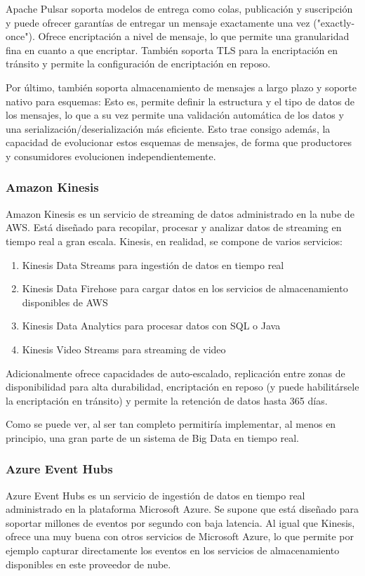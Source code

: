 Apache Pulsar soporta modelos de entrega como colas, publicación y suscripción y puede ofrecer garantías de entregar un mensaje 
exactamente una vez ("exactly-once"). Ofrece encriptación a nivel de mensaje, lo que permite una granularidad fina en cuanto a que encriptar. 
También soporta TLS para la encriptación en tránsito y permite la configuración de encriptación en reposo.
\newline

Por último, también soporta almacenamiento de mensajes a largo plazo y soporte nativo para esquemas:
Esto es, permite definir la estructura y el tipo de datos de los mensajes, lo que a su vez permite una validación automática de los datos 
y una serialización/deserialización más eficiente. Esto trae consigo además, la capacidad de evolucionar estos esquemas de mensajes,
de forma que productores y consumidores evolucionen independientemente.

\subsubsection{Amazon Kinesis}
Amazon Kinesis es un servicio de streaming de datos administrado en la nube de AWS. 
Está diseñado para recopilar, procesar y analizar datos de streaming en tiempo real a gran escala.
Kinesis, en realidad, se compone de varios servicios:
\begin{enumerate}
    \item Kinesis Data Streams para ingestión de datos en tiempo real
    \item Kinesis Data Firehose para cargar datos en los servicios de almacenamiento disponibles de AWS
    \item Kinesis Data Analytics para procesar datos con SQL o Java
    \item Kinesis Video Streams para streaming de video  
\end{enumerate}
Adicionalmente ofrece capacidades de auto-escalado, replicación entre zonas de disponibilidad para alta durabilidad, encriptación en reposo 
(y puede habilitársele la encriptación en tránsito) y permite la retención de datos hasta 365 días.
\newline

Como se puede ver, al ser tan completo permitiría implementar, al menos en principio, una gran parte de un sistema de Big Data en tiempo real.

\subsubsection{Azure Event Hubs}
Azure Event Hubs es un servicio de ingestión de datos en tiempo real administrado en la plataforma Microsoft Azure.
Se supone que está diseñado para soportar millones de eventos por segundo con baja latencia. Al igual que Kinesis,
ofrece una muy buena con otros servicios de Microsoft Azure, lo que permite por ejemplo capturar directamente los eventos
en los servicios de almacenamiento disponibles en este proveedor de nube.\newline

